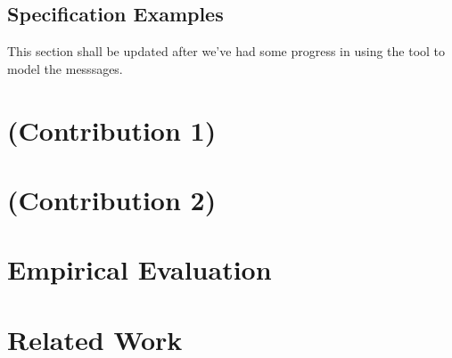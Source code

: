 \documentclass[acmsmall,review,authorversion]{acmart}
\begin{document}
\subsection{Specification Examples}
This section shall be updated after we've had some progress in using the tool to model the messsages. 

\section{(Contribution 1)}

\section{(Contribution 2)}

\section{Empirical Evaluation}

\section{Related Work}
\end{document}
